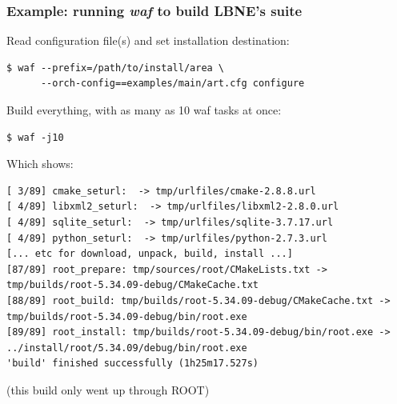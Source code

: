 \documentclass[xcolor=dvipsnames]{beamer}
\newcommand{\app}[1]{\textbf{\textit{#1}}\xspace}
\def\waf{\app{waf}}
\begin{document}
\begin{frame}[fragile]
  \frametitle{Example: running \waf to build LBNE's suite }

  \footnotesize

  Read configuration file(s) and set installation destination:

\begin{verbatim}
$ waf --prefix=/path/to/install/area \
      --orch-config==examples/main/art.cfg configure
\end{verbatim}
  
  Build everything, with as many as 10 waf tasks at once:

\begin{verbatim}
$ waf -j10
\end{verbatim}

  Which shows:

\begin{verbatim}
[ 3/89] cmake_seturl:  -> tmp/urlfiles/cmake-2.8.8.url
[ 4/89] libxml2_seturl:  -> tmp/urlfiles/libxml2-2.8.0.url
[ 4/89] sqlite_seturl:  -> tmp/urlfiles/sqlite-3.7.17.url
[ 4/89] python_seturl:  -> tmp/urlfiles/python-2.7.3.url
[... etc for download, unpack, build, install ...]
[87/89] root_prepare: tmp/sources/root/CMakeLists.txt -> tmp/builds/root-5.34.09-debug/CMakeCache.txt
[88/89] root_build: tmp/builds/root-5.34.09-debug/CMakeCache.txt -> tmp/builds/root-5.34.09-debug/bin/root.exe
[89/89] root_install: tmp/builds/root-5.34.09-debug/bin/root.exe -> ../install/root/5.34.09/debug/bin/root.exe
'build' finished successfully (1h25m17.527s)
\end{verbatim}
  \begin{center}
      {\tiny (this build only went up through ROOT)}
  \end{center}
\end{frame}
\end{document}
